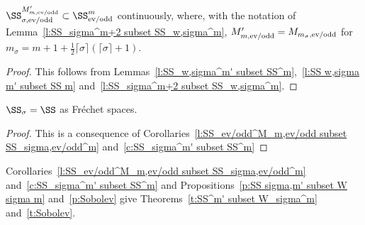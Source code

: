 \begin{Corollary}\label{c:SS_sigma^m' subset SS^m}
  $\SS_{\sigma,\text{\rm ev/odd}}^{M'_{m,\text{\rm ev/odd}}}\subset\SS_{\text{\rm ev/odd}}^m$ continuously, where, with the notation of Lemma~{\rm \ref{l:SS_sigma^m+2 subset SS_w,sigma^m}}, $M'_{m,\text{\rm ev/odd}}=M_{m_\sigma,\text{\rm ev/odd}}$ for $m_\sigma=m+1+\frac{1}{2}\lceil\sigma\rceil(\lceil\sigma\rceil+1)$.
\end{Corollary}

\begin{proof}
  This follows from Lemmas~\ref{l:SS_w,sigma^m' subset SS^m},~\ref{l:SS w,sigma m' subset SS m} and~\ref{l:SS_sigma^m+2 subset SS_w,sigma^m}.
\end{proof}

\begin{Corollary}\label{c:SS_sigma = SS}
  $\SS_\sigma=\SS$ as Fr\'echet spaces.
\end{Corollary}

\begin{proof}
  This is a consequence of Corollaries~\ref{l:SS_ev/odd^M_m,ev/odd subset SS_sigma,ev/odd^m} and~\ref{c:SS_sigma^m' subset SS^m}
\end{proof}

Corollaries~\ref{l:SS_ev/odd^M_m,ev/odd subset SS_sigma,ev/odd^m} and~\ref{c:SS_sigma^m' subset SS^m} and Propositions~\ref{p:SS sigma,m' subset W sigma m} and~\ref{p:Sobolev} give Theorems~\ref{t:SS^m' subset W_sigma^m} and~\ref{t:Sobolev}.
